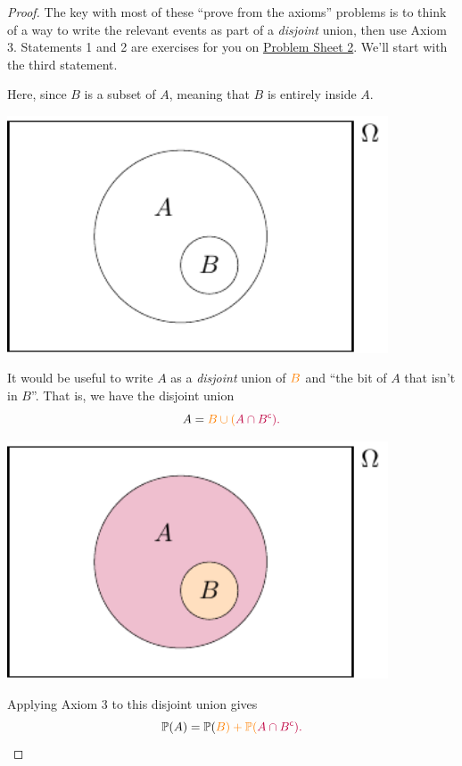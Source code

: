 \documentclass[
  a4paper,
]{book}
\theoremstyle{definition}
\theoremstyle{definition}
\theoremstyle{definition}
\theoremstyle{definition}
\theoremstyle{remark}
\begin{document}
\begin{proof}
The key with most of these ``prove from the axioms'' problems is to think of a way to write the relevant events as part of a \emph{disjoint} union, then use Axiom 3. Statements 1 and 2 are exercises for you on \protect\hyperlink{P2}{Problem Sheet 2}. We'll start with the third statement.

Here, since \(B\) is a subset of \(A\), meaning that \(B\) is entirely inside \(A\).

\begin{center}\includegraphics[width=320pt]{math1710_files/figure-latex/subs0-1} \end{center}

It would be useful to write \(A\) as a \emph{disjoint} union of \(\color{orange}B\) and {``the bit of \(A\) that isn't in \(B\)''}. That is, we have the disjoint union
\[ A = \color{orange}B \cup (\color{purple}{A \cap B^\mathsf{c}}) .\]

\begin{center}\includegraphics[width=320pt]{math1710_files/figure-latex/subs-1} \end{center}

Applying Axiom 3 to this disjoint union gives
\[ \mathbb P(A) =  \mathbb P(\color{orange}B) + \mathbb P(\color{purple}{A \cap B^\mathsf{c}}) . \]


\end{proof}
\end{document}
